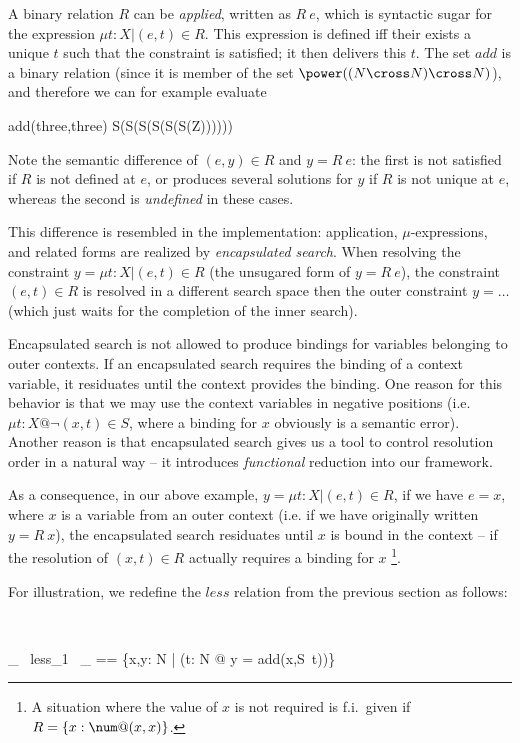 \documentclass{article}
\begin{document}
A binary relation $R$ can be \emph{applied}, written as $R~e$, which
is syntactic sugar for the expression $\mu t:X | (e,t) \in R$.  This
expression is defined iff their exists a unique $t$ such that the
constraint is satisfied; it then delivers this $t$. The set $add$ is a
binary relation (since it is member of the set $\power((N \cross N)
\cross N)$), and therefore we can for example evaluate

\begin{zexecexpr}
 add(three,three) 
\yields
S(S(S(S(S(S(Z))))))
\end{zexecexpr}

Note the semantic difference of $(e,y) \in R$ and $y=R~e$: the first
is not satisfied if $R$ is not defined at $e$, or produces several
solutions for $y$ if $R$ is not unique at $e$, whereas the second is
\emph{undefined} in these cases. 

This difference is resembled in the implementation: application,
$\mu$-expressions, and related forms are realized by
\emph{encapsulated search}.  When resolving the constraint $y = \mu t:X
| (e,t) \in R$ (the unsugared form of $y = R~e$), the constraint
$(e,t) \in R$ is resolved in a different search space then the outer
constraint $y = \ldots$ (which just waits for the completion of
the inner search). 

Encapsulated search is not allowed to produce bindings for variables
belonging to outer contexts. If an encapsulated search requires the
binding of a context variable, it residuates until the context
provides the binding. One reason for this behavior is that we may use
the context variables in negative positions (i.e.~$\mu t:X @ \lnot
(x,t) \in S$, where a binding for $x$ obviously is a semantic error).
Another reason is that encapsulated search gives us a tool to control
resolution order in a natural way -- it introduces \emph{functional}
reduction into our framework.

As a consequence, in our above example, $y = \mu t:X | (e,t) \in R$,
if we have $e = x$, where $x$ is a variable from an outer context
(i.e. if we have originally written $y = R~x$), the encapsulated
search residuates until $x$ is bound in the context -- if the
resolution of $(x,t) \in R$ actually requires a binding for $x$
\footnote{A situation where the value of $x$ is not required is
  f.i.~given if $R = \{x:\num@(x,x)\}$.}.

For illustration, we redefine the $less$ relation from the
previous section as follows:

\begin{zedgroup}
\begin{zdirectives}
\end{zdirectives} \\
\begin{axdef}
  \_ ~less_1~ \_ == \{x,y: N | (\exists t: N @ y = add(x,S~t))\}
\end{axdef}
\end{zedgroup}
\end{document}
